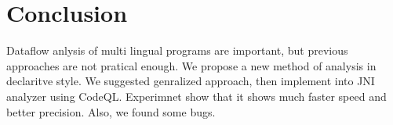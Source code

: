 \section{Conclusion}
Dataflow anlysis of multi lingual programs are important,
but previous approaches are not pratical enough.
We propose a new method of analysis in declaritve style.
We suggested genralized approach,
then implement into JNI analyzer using CodeQL.
Experimnet show that it shows much faster speed and better precision.
Also, we found some bugs.
